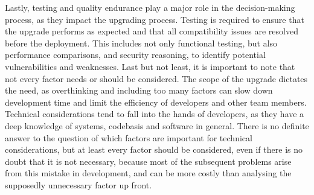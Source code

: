 \newline \noindent Lastly, testing and quality endurance play a major role in the decision-making process, as they impact the upgrading process. Testing is required to ensure that the upgrade performs as expected and that all compatibility issues are resolved before the deployment. This includes not only functional testing, but also performance comparisons, and security reasoning, to identify potential vulnerabilities and weaknesses. 
\newline \noindent Last but not least, it is important to note that not every factor needs or should be considered. The scope of the upgrade dictates the need, as overthinking and including too many factors can slow down development time and limit the efficiency of developers and other team members. Technical considerations tend to fall into the hands of developers, as they have a deep knowledge of systems, codebasis and software in general. There is no definite answer to the question of which factors are important for technical considerations, but at least every factor should be considered, even if there is no doubt that it is not necessary, because most of the subsequent problems arise from this mistake in development, and can be more costly than analysing the supposedly unnecessary factor up front. \cite{feldman_systematic_2017}


